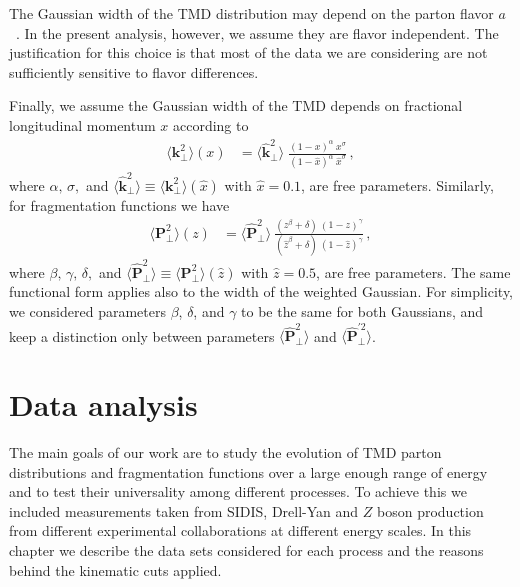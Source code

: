 \documentclass[aps,preprintnumbers,showpacs,nofootinbib,superscriptaddress,floatfix]{revtex4}
\newcommand{\T}{\perp}
\begin{document}
The
Gaussian width of the TMD distribution may depend 
on the parton flavor $a$~\cite{Signori:2013mda}. 
In the present analysis, however, we assume they are
flavor independent. The justification for this choice is that most of the data
we are considering are not sufficiently sensitive to flavor differences.

Finally, we assume the Gaussian width of the TMD depends on 
fractional longitudinal momentum $x$ according to
\begin{align} 
\big\langle \bm{k}_{\T}^2 \big\rangle (x) &= \big\langle \hat{\bm{k}}_{\T}^2 \big\rangle \;  
\frac{(1-x)^{\alpha} \  x^{\sigma} }{ (1 - \hat{x})^{\alpha} \  \hat{x}^{\sigma} } \, ,
\label{e:kT2_kin}
\end{align}
where $\alpha, \, \sigma,$ and $\big\langle \hat{\bm{k}}_{\T}^2 \big\rangle
\equiv \big\langle \bm{k}_{\T}^2 \big\rangle (\hat{x})$ with $\hat{x} = 0.1$,
are free parameters. Similarly, for fragmentation functions we have
\begin{align}  
\big\langle \bm{P}_{\T}^2 \big\rangle (z) &= \big\langle \hat{\bm{P}}_{\T}^2 \big\rangle \  
               \frac{ (z^{\beta} + \delta)\ (1-z)^{\gamma} }{ (\hat{z}^{\beta} + \delta)\   (1 - \hat{z})^{\gamma} } \, ,
 \label{e:PT2_kin}
 \end{align}
where $\beta, \, \gamma, \, \delta, $ and $\big\langle \hat{\bm{P}}_{\T}^2 \big\rangle \equiv \big \langle \bm{P}_{\T}^2 \big\rangle
(\hat{z})$ with $\hat{z} = 0.5$, are free parameters. The same functional form
applies also to the width of the weighted Gaussian. For simplicity, we
considered parameters $\beta$, $\delta$, and $\gamma$ to be the same for both
Gaussians, and keep a distinction only between parameters 
$\big\langle \hat{\bm{P}}_{\T}^2 \big\rangle$ and
$\big\langle \hat{\bm{P}}_{\T}^{\prime 2} \big\rangle$.
 

\section{Data analysis}
\label{s:data_analysis}


The main goals of our work are to study the evolution of TMD parton distributions and fragmentation functions over a large enough range of energy and to test their universality among different processes. To achieve this we included measurements taken from SIDIS, Drell-Yan and $Z$ boson production from different experimental collaborations at different energy scales.
In this chapter we describe the data sets considered for each process and the reasons behind the kinematic cuts applied.
\end{document}
